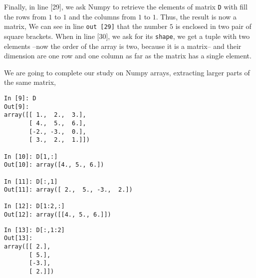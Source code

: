 \begin{paracol}{2}
 Finally, in line [29], we ask Numpy to retrieve the elements of matrix \texttt{D} with fill the rows from $1$ to $1$ and the columns from $1$ to $1$. Thus, the result is now a matrix, We can see in line \texttt{out [29]} that the number $5$ is enclosed in two pair of square brackets. When in line [30], we ask for its \texttt{shape}, we get a tuple with two elements  --now the order of the array is two, because it is a matrix-- and their dimension are one row and one column as far as the matrix has a single element.

 We are going to complete our study on Numpy arrays, extracting larger parts of the same matrix, 
 \end{paracol}
\begin{center}
 \begin{minipage}{0.3\textwidth}
    \begin{verbatim}
In [9]: D
Out[9]: 
array([[ 1.,  2.,  3.],
       [ 4.,  5.,  6.],
       [-2., -3.,  0.],
       [ 3.,  2.,  1.]])

In [10]: D[1,:]
Out[10]: array([4., 5., 6.])

In [11]: D[:,1]
Out[11]: array([ 2.,  5., -3.,  2.])
    
In [12]: D[1:2,:]
Out[12]: array([[4., 5., 6.]])
\end{verbatim}
\end{minipage}
\end{center}
\begin{center}
 \begin{minipage}{0.3\textwidth}
    \begin{verbatim}
In [13]: D[:,1:2]
Out[13]: 
array([[ 2.],
       [ 5.],
       [-3.],
       [ 2.]])
    \end{verbatim}
\end{minipage}
\end{center}
